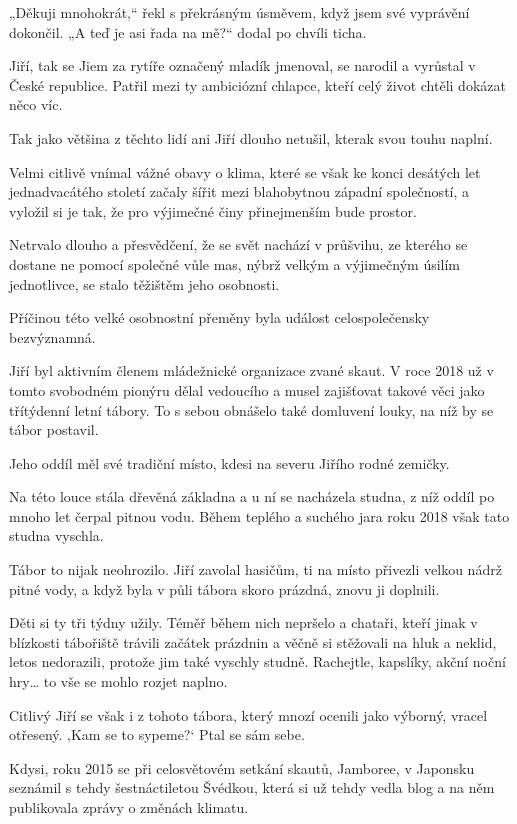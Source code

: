 „Děkuji mnohokrát,“ řekl s překrásným úsměvem, když jsem své vyprávění dokončil. „A teď je asi řada na mě?“ dodal po chvíli ticha. 

Jiří, tak se Jiem za rytíře označený mladík jmenoval, se narodil a vyrůstal v České republice. Patřil mezi ty ambiciózní chlapce, kteří celý život chtěli dokázat něco víc.

Tak jako většina z těchto lidí ani Jiří dlouho netušil, kterak svou touhu naplní.  

Velmi citlivě vnímal vážné obavy o klima, které se však ke konci desátých let jednadvacátého století začaly šířit mezi blahobytnou západní společností, a vyložil si je tak, že pro výjimečné činy přinejmenším bude prostor.

Netrvalo dlouho a přesvědčení, že se svět nachází v průšvihu, ze kterého se dostane ne pomocí společné vůle mas, nýbrž velkým a výjimečným úsilím jednotlivce, se stalo těžištěm jeho osobnosti.

Příčinou této velké osobnostní přeměny byla událost celospolečensky bezvýznamná.

Jiří byl aktivním členem mládežnické organizace zvané skaut. V roce 2018 už v tomto svobodném pionýru dělal vedoucího a musel zajišťovat takové věci jako třítýdenní letní tábory. To s sebou obnášelo také domluvení louky, na níž by se tábor postavil.

Jeho oddíl měl své tradiční místo, kdesi na severu Jiřího rodné zemičky.

Na této louce stála dřevěná základna a u ní se nacházela studna, z níž oddíl po mnoho let čerpal pitnou vodu. Během teplého a suchého jara roku 2018 však tato studna vyschla.

Tábor to nijak neohrozilo. Jiří zavolal hasičům, ti na místo přivezli velkou nádrž pitné vody, a když byla v půli tábora skoro prázdná, znovu ji doplnili.
 
 Děti si ty tři týdny užily. Téměř během nich nepršelo a chataři, kteří jinak v blízkosti tábořiště trávili začátek prázdnin a věčně si stěžovali na hluk a neklid, letos nedorazili, protože jim také vyschly studně. Rachejtle, kapslíky, akční noční hry… to vše se mohlo rozjet naplno.

Citlivý Jiří se však i z tohoto tábora, který mnozí ocenili jako výborný, vracel otřesený. ‚Kam se to sypeme?‘ Ptal se sám sebe.

Kdysi, roku 2015 se při celosvětovém setkání skautů, Jamboree, v Japonsku seznámil s tehdy šestnáctiletou Švédkou, která si už tehdy vedla blog a na něm publikovala zprávy o změnách klimatu. 

